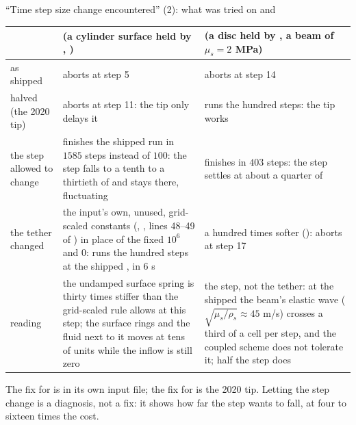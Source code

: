 \documentclass[aspectratio=169,11pt]{beamer}
\begin{document}
\begin{frame}{``Time step size change encountered'' (2): what was tried on  and }
\label{fr:dt2}
\scriptsize
\setlength{\tabcolsep}{3pt}
\begin{tabular}{@{}L{0.11\textwidth}L{0.37\textwidth}L{0.46\textwidth}@{}}
\toprule
&  (a cylinder surface held by , ) &  (a disc held by , a beam of $\mu_s = 2$ MPa) \\
\midrule
as shipped & aborts at step 5 & aborts at step 14 \\
 halved (the 2020 tip) & aborts at step 11: the tip only delays it & runs the hundred steps: the tip works \\
the step allowed to change & finishes the shipped run in $1585$ steps instead of $100$: the step falls to a tenth to a thirtieth of  and stays there, fluctuating & finishes in $403$ steps: the step settles at about a quarter of  \\
the tether changed & the input's own, unused, grid-scaled constants (, , lines 48--49 of ) in place of the fixed $10^6$ and $0$: runs the hundred steps at the shipped , in $6$ s & a hundred times softer (): aborts at step 17 \\
\midrule
reading & the undamped surface spring is thirty times stiffer than the grid-scaled rule allows at this step; the surface rings and the fluid next to it moves at tens of units while the inflow is still zero & the step, not the tether: at the shipped  the beam's elastic wave ($\sqrt{\mu_s/\rho_s} \approx 45$ m/s) crosses a third of a cell per step, and the coupled scheme does not tolerate it; half the step does \\
\bottomrule
\end{tabular}

\medskip
The fix for  is in its own input file; the fix for  is the 2020 tip. Letting the step change is a diagnosis, not a fix: it shows how far the step wants to fall, at four to sixteen times the cost.
\end{frame}
\end{document}
